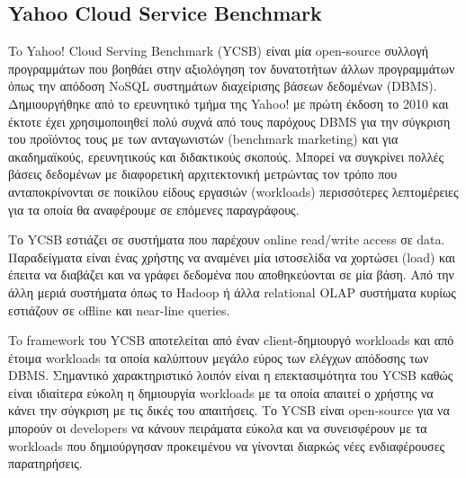 \documentclass[conference]{IEEEtran}
\begin{document}
\subsection{Yahoo Cloud Service Benchmark}
        To Yahoo! Cloud Serving Benchmark (YCSB) είναι μία open-source συλλογή προγραμμάτων που βοηθάει στην αξιολόγηση τον δυνατοτήτων άλλων προγραμμάτων όπως την απόδοση NoSQL συστημάτων διαχείρισης βάσεων δεδομένων (DBMS). Δημιουργήθηκε από το ερευνητικό τμήμα της Yahoo! με πρώτη έκδοση το 2010 και έκτοτε έχει χρησιμοποιηθεί πολύ συχνά από τους παρόχους DBMS για την σύγκριση του προϊόντος τους με των ανταγωνιστών (benchmark marketing) και για ακαδημαϊκούς, ερευνητικούς και διδακτικούς σκοπούς. Μπορεί να συγκρίνει πολλές βάσεις δεδομένων με διαφορετική αρχιτεκτονική μετρώντας τον τρόπο που ανταποκρίνονται σε ποικίλου είδους εργασιών (workloads) περισσότερες λεπτομέρειες για τα οποία θα αναφέρουμε σε επόμενες παραγράφους.
       
        Το YCSB εστιάζει σε συστήματα που παρέχουν online read/write access σε data. Παραδείγματα είναι ένας χρήστης να αναμένει μία ιστοσελίδα να χορτώσει (load) και έπειτα να διαβάζει και να γράφει δεδομένα που αποθηκεύονται σε μία βάση. Από την άλλη μεριά συστήματα όπως το Hadoop ή  άλλα relational OLAP συστήματα κυρίως εστιάζουν σε offline και near-line queries.
	   
        To framework του YCSB αποτελείται από έναν client-δημιουργό workloads και από έτοιμα workloads τα οποία καλύπτουν μεγάλο εύρος των ελέγχων απόδοσης των DBMS. Σημαντικό χαρακτηριστικό λοιπόν είναι η επεκτασιμότητα του YCSB καθώς είναι ιδιαίτερα εύκολη η δημιουργία workloads με τα οποία απαιτεί ο χρήστης να κάνει την σύγκριση με τις δικές του απαιτήσεις. Το YCSB είναι open-source για να μπορούν οι developers να κάνουν πειράματα εύκολα και να συνεισφέρουν με τα workloads που δημιούργησαν προκειμένου να γίνονται διαρκώς νέες ενδιαφέρουσες παρατηρήσεις.
\end{document}
